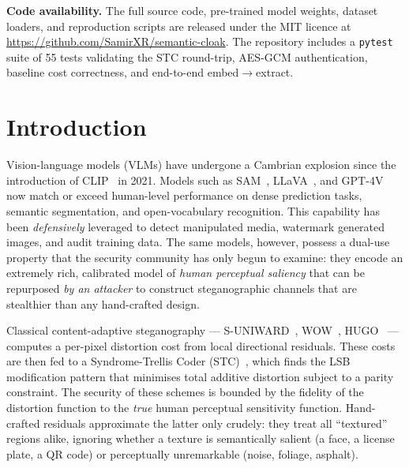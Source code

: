 \documentclass[10pt,a4paper]{article}
\begin{document}
\vspace{0.5em}

\noindent\textbf{Code availability.} The full source code, pre-trained
model weights, dataset loaders, and reproduction scripts are released
under the MIT licence at \url{https://github.com/SamirXR/semantic-cloak}.
The repository includes a \texttt{pytest} suite of 55 tests validating
the STC round-trip, AES-GCM authentication, baseline cost correctness,
and end-to-end embed$\to$extract.

\section{Introduction}
\label{sec:intro}

Vision-language models (VLMs) have undergone a Cambrian explosion since
the introduction of CLIP~\cite{radford2021clip} in 2021. Models such as
SAM~\cite{kirillov2023sam}, LLaVA~\cite{liu2023llava}, and
GPT-4V~\cite{openai2024gpt4v} now match or exceed human-level
performance on dense prediction tasks, semantic segmentation, and
open-vocabulary recognition. This capability has been \emph{defensively}
leveraged to detect manipulated media, watermark generated images, and
audit training data. The same models, however, possess a dual-use
property that the security community has only begun to examine: they
encode an extremely rich, calibrated model of \emph{human perceptual
saliency} that can be repurposed \emph{by an attacker} to construct
steganographic channels that are stealthier than any hand-crafted
design.

Classical content-adaptive steganography --- S-UNIWARD~\cite{holub2014suniv},
WOW~\cite{holub2012wow}, HUGO~\cite{pevny2010hugo} --- computes a
per-pixel distortion cost from local directional residuals. These costs
are then fed to a Syndrome-Trellis Coder (STC)~\cite{filler2011stc},
which finds the LSB modification pattern that minimises total additive
distortion subject to a parity constraint. The security of these
schemes is bounded by the fidelity of the distortion function to the
\emph{true} human perceptual sensitivity function. Hand-crafted
residuals approximate the latter only crudely: they treat all
``textured'' regions alike, ignoring whether a texture is semantically
salient (a face, a license plate, a QR code) or perceptually
unremarkable (noise, foliage, asphalt).
\end{document}
